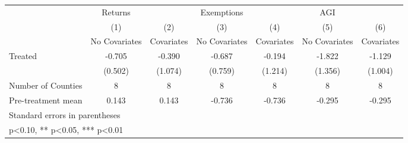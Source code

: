 {
\def\sym#1{\ifmmode^{#1}\else\(^{#1}\)\fi}
\begin{tabular}{l*{6}{c}}
\hline\hline
            &     Returns   &               &  Exemptions   &               &         AGI   &               \\
            &\multicolumn{1}{c}{(1)}&\multicolumn{1}{c}{(2)}&\multicolumn{1}{c}{(3)}&\multicolumn{1}{c}{(4)}&\multicolumn{1}{c}{(5)}&\multicolumn{1}{c}{(6)}\\
            &\multicolumn{1}{c}{No Covariates}&\multicolumn{1}{c}{Covariates}&\multicolumn{1}{c}{No Covariates}&\multicolumn{1}{c}{Covariates}&\multicolumn{1}{c}{No Covariates}&\multicolumn{1}{c}{Covariates}\\
\hline
Treated     &      -0.705   &      -0.390   &      -0.687   &      -0.194   &      -1.822   &      -1.129   \\
            &     (0.502)   &     (1.074)   &     (0.759)   &     (1.214)   &     (1.356)   &     (1.004)   \\
\hline
Number of Counties&           8   &           8   &           8   &           8   &           8   &           8   \\
Pre-treatment mean&       0.143   &       0.143   &      -0.736   &      -0.736   &      -0.295   &      -0.295   \\
\hline\hline
\multicolumn{7}{l}{\footnotesize Standard errors in parentheses}\\
\multicolumn{7}{l}{\footnotesize * p<0.10, ** p<0.05, *** p<0.01}\\
\end{tabular}
}
